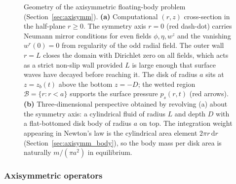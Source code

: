 \documentclass{article}
\begin{document}
\begin{figure}[H]
\begin{minipage}[t]{0.42\textwidth}
\end{minipage}

\caption{Geometry of the axisymmetric floating-body problem (Section~\ref{sec:axisymm}).
\textbf{(a)} Computational $(r, z)$ cross-section in the half-plane $r \ge 0$.
The symmetry axis $r = 0$ (red dash-dot) carries Neumann mirror conditions for even fields $\phi, \eta, w^z$ and the vanishing $w^r(0) = 0$ from regularity of the odd radial field.
The outer wall $r = L$ closes the domain with Dirichlet zero on all fields, which acts as a strict non-slip wall provided $L$ is large enough that surface waves have decayed before reaching it.
The disk of radius $a$ sits at $z = z_b(t)$ above the bottom $z = -D$; the wetted region $\mathcal{B} = \{r : r < a\}$ supports the surface pressure $p_s(r, t)$ (red arrows).
\textbf{(b)} Three-dimensional perspective obtained by revolving (a) about the symmetry axis: a cylindrical fluid of radius $L$ and depth $D$ with a flat-bottomed disk body of radius $a$ on top.
The integration weight appearing in Newton's law is the cylindrical area element $2\pi r\,\mathrm{d} r$ (Section~\ref{sec:axisymm_body}), so the body mass per disk area is naturally $m/(\pi a^2)$ in equilibrium.}
\label{fig:schematic_axi}
\end{figure}

\subsubsection{Axisymmetric operators}
\label{sec:axisymm_ops}
\end{document}
